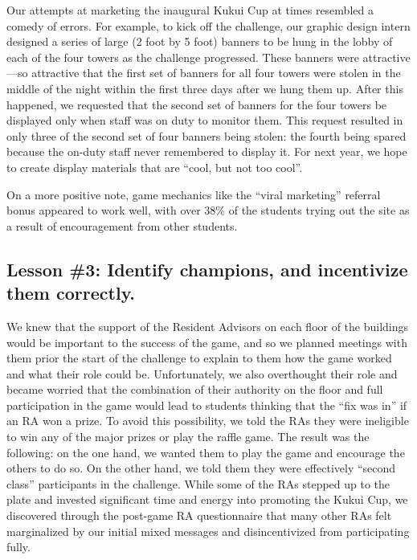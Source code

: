 \documentclass{acm_proc_article-sp}
\begin{document}
Our attempts at marketing the inaugural Kukui Cup at times resembled a
comedy of errors. For example, to kick off the challenge, our graphic
design intern designed a series of large (2 foot by 5 foot) banners to be
hung in the lobby of each of the four towers as the challenge progressed.
These banners were attractive---so attractive that the first set of banners
for all four towers were stolen in the middle of the night within the first
three days after we hung them up.  After this happened, we requested that
the second set of banners for the four towers be displayed only when staff
was on duty to monitor them.  This request resulted in only three of the
second set of four banners being stolen: the fourth being spared because
the on-duty staff never remembered to display it.  For next year, we hope
to create display materials that are ``cool, but not too cool''.

On a more positive note, game mechanics like the ``viral marketing''
referral bonus appeared to work well, with over 38\% of the students trying out the
site as a result of encouragement from other students. 

\subsection{Lesson \#3: Identify champions, and incentivize them correctly.}

We knew that the support of the Resident Advisors on each floor of the buildings would be important to the success of the game, and so we planned meetings with them prior the start of the challenge to explain to them how the game worked and what their role could be.  Unfortunately, we also overthought their role and became worried that the combination of their authority on the floor and full participation in the game would lead to students thinking that the ``fix was in'' if an RA won a prize.  To avoid this possibility, we told the RAs they were ineligible to win any of the major prizes or play the raffle game.  The result was the following: on the one hand, we wanted them to play the game and encourage the others to do so.  On the other hand, we told them they were effectively ``second class'' participants in the challenge.  While some of the RAs stepped up to the plate and invested significant time and energy into promoting the Kukui Cup, we discovered through the post-game RA questionnaire that many other RAs felt marginalized by our initial mixed messages and disincentivized from participating fully.
\end{document}
